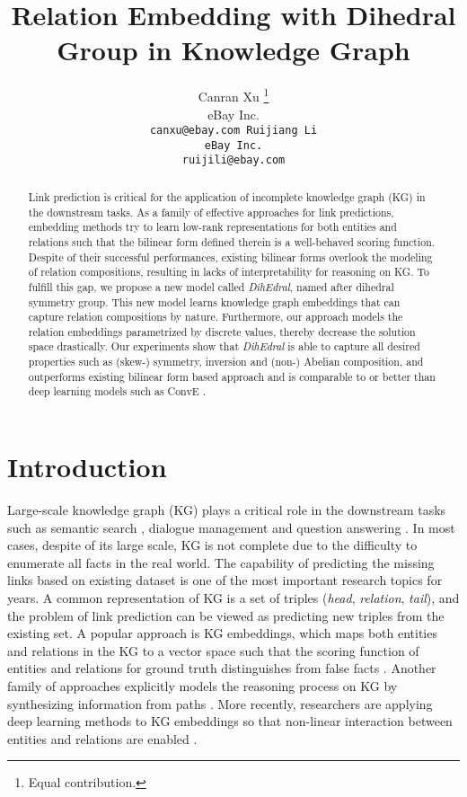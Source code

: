 \documentclass[11pt,a4paper]{article}
\title{Relation Embedding with Dihedral Group in  Knowledge Graph}
\author{Canran Xu \thanks{\protect\phantom{\footnotesize 1}Equal contribution.} \\
  eBay Inc. \\
  \tt canxu@ebay.com
\And Ruijiang Li \footnotemark[1] \\
  eBay Inc. \\
  \tt ruijili@ebay.com
\\}
\date{}
\begin{document}
\maketitle
\begin{abstract}
Link prediction is critical for the application of incomplete knowledge graph (KG) in the downstream tasks. As a family of effective approaches for link predictions, embedding methods try to learn low-rank representations for both entities and relations such that the bilinear form defined therein is a well-behaved scoring function. Despite of their successful performances, existing bilinear forms overlook the modeling of relation compositions, resulting in lacks of interpretability for reasoning on KG. To fulfill this gap, we propose a new model called \textit{DihEdral}, named after dihedral symmetry group. This new model learns knowledge graph embeddings that can capture relation compositions by nature. Furthermore, our approach models the relation embeddings parametrized by discrete values, thereby decrease the solution space drastically. Our experiments show that \textit{DihEdral} is able to capture all desired properties such as (skew-) symmetry, inversion and (non-) Abelian composition, and outperforms existing bilinear form based approach and is comparable to or better than deep learning models such as ConvE \cite{convE}.
\end{abstract}

\section{Introduction}
Large-scale knowledge graph (KG) plays a critical role in the downstream tasks such as semantic search \cite{semantic_search}, dialogue management \cite{dialogue} and question answering \cite{kbqa}. In most cases, despite of its large scale, KG is not complete due to the difficulty to enumerate all facts in the real world. The capability of predicting the missing links based on existing dataset is one of the most important research topics for years.  A common representation of KG is a set of triples (\textit{head}, \textit{relation}, \textit{tail}), and the problem of link prediction can be viewed as predicting new triples from the existing set. A popular approach is KG embeddings, which maps both entities and relations in the KG to a vector space such that the scoring function of entities and relations for ground truth distinguishes from false facts \cite{ntn, transe, distmult}. Another family of approaches explicitly models the reasoning process on KG by synthesizing information from paths \cite{guu}. More recently, researchers are applying deep learning methods to KG embeddings so that non-linear interaction between entities and relations are enabled \cite{rgcn, convE}.
\end{document}
